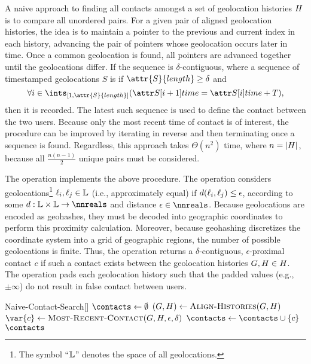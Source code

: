 A naive approach to finding all contacts amongst a set of geolocation histories $H$ is to compare all unordered pairs. For a given pair of aligned geolocation histories, the idea is to maintain a pointer to the previous and current index in each history, advancing the pair of pointers whose geolocation occurs later in time. Once a common geolocation is found, all pointers are advanced together until the geolocations differ. If the sequence is $\delta$-contiguous, where a sequence of timestamped geolocations $S$ is  if $\attr{S}{length} \geq \delta$ and
\begin{equation*}
  \forall i \in \ints_{[1, \attr{S}{length}]}(\aTime{S[i + 1]} = \aTime{S[i]} + T),
\end{equation*}
then it is recorded. The latest such sequence is used to define the contact between the two users. Because only the most recent time of contact is of interest, the procedure can be improved by iterating in reverse and then terminating once a sequence is found. Regardless, this approach takes $\Theta(n^2)$ time, where $n = \left\vert H \right\vert$, because all $\frac{n(n - 1)}{2}$ unique pairs must be considered.

The  operation implements the above procedure. The operation  considers geolocations\footnote{The symbol ``$\mathbb{L}$'' denotes the space of all geolocations.} $\ell_i, \ell_j \in \mathbb{L}$  (i.e., approximately equal) if $d(\ell_i, \ell_j) \leq \epsilon$, according to some  $d: \locations \times \locations \rightarrow \nnreals$ \cite[p. 118]{Kelley1975} and distance $\epsilon \in \nnreals$. Because geolocations are encoded as geohashes, they must be decoded into geographic coordinates to perform this proximity calculation. Moreover, because geohashing discretizes the coordinate system into a grid of geographic regions, the number of possible geolocations is finite. Thus, the operation returns a $\delta$-contiguous, $\epsilon$-proximal contact $c$ if such a contact exists between the geolocation histories $G, H \in H$. The  operation pads each geolocation history such that the padded values (e.g., $\pm \infty$) do not result in false contact between users.

\begin{function}{Naive-Contact-Search}[\histories]
  \State $\contacts \assign \emptyset$
    \State $(\hone, \htwo) \assign \Call{Align-Histories}{\hone, \htwo}$
    \State $\var{c} \assign \Call{Most-Recent-Contact}{\hone, \htwo, \epsilon, \delta}$
      \State $\contacts \assign \contacts \cup \{c\}$
    \EndIf
  \EndFor
  \State \Return $\contacts$
\end{function}

